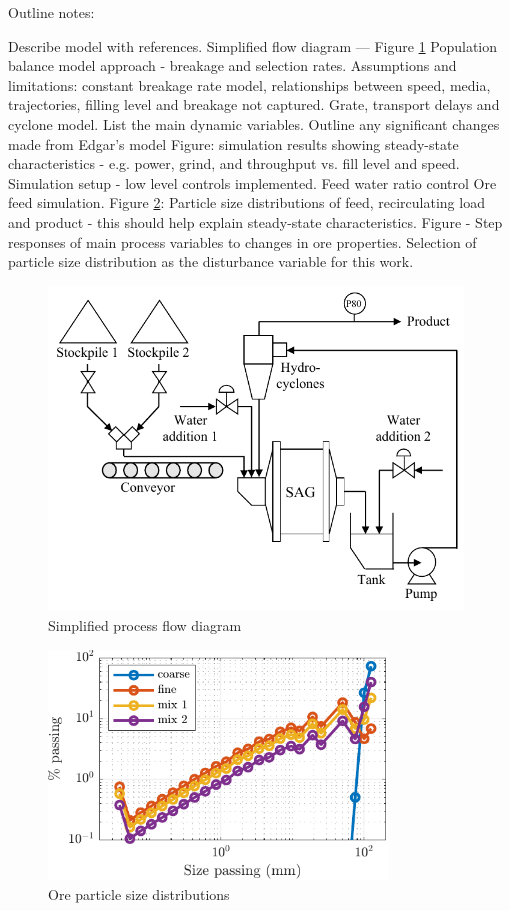 Outline notes:
\begin{outline}
	\1 Describe model with references.
	\1 Simplified flow diagram — Figure \ref{fig:sag-diag}
	\1 Population balance model approach - breakage and selection rates.
    \1 Assumptions and limitations: constant breakage rate model, relationships between speed, media, trajectories,  filling level and breakage not captured.
	\1 Grate, transport delays and cyclone model.
	\1 List the main dynamic variables.
	\1 Outline any significant changes made from Edgar's model
	\1 Figure: simulation results showing steady-state characteristics - e.g. power, grind, and throughput vs. fill level and speed.
	\1 Simulation setup - low level controls implemented.
	\2 Feed water ratio control
	\2 Ore feed simulation.
	\1 Figure \ref{fig:coarse_fine_psd_plot}: Particle size distributions of feed, recirculating load and product - this should help explain steady-state characteristics.
	\1 Figure - Step responses of main process variables to changes in ore properties.
	\1 Selection of particle size distribution as the disturbance variable for this work.
\end{outline}



\begin{figure}[htp]
	\centering
	\includegraphics[width=11cm]{images/sag-circuit-diag.pdf}
	\caption{Simplified process flow diagram}
	\label{fig:sag-diag}
\end{figure}

\begin{figure}[htp]
	\centering
	\includegraphics[width=9cm]{images/coarse_fine_psd_plot.pdf}
	\caption{Ore particle size distributions}
	\label{fig:coarse_fine_psd_plot}
\end{figure}


